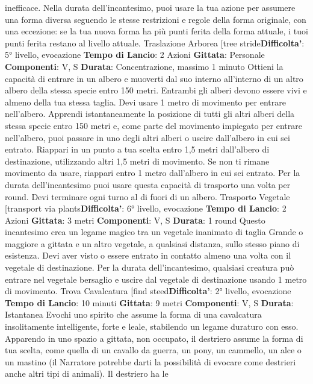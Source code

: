 \begin{multicols}{2}
inefficace.
Nella durata dell’incantesimo, puoi usare la tua azione
per assumere una forma diversa seguendo le stesse
restrizioni e regole della forma originale, con una
eccezione: se la tua nuova forma ha più punti ferita
della forma attuale, i tuoi punti ferita restano al livello
attuale.
Traslazione Arborea
[tree stride\textbf{Difficolta'}:
5° livello, evocazione
\textbf{Tempo di Lancio}: 2 Azioni
\textbf{Gittata}: Personale
\textbf{Componenti}: V, S
\textbf{Durata}: Concentrazione, massimo 1 minuto
Ottieni la capacità di entrare in un albero e muoverti dal
suo interno all’interno di un altro albero della stessa
specie entro 150 metri. Entrambi gli alberi devono
essere vivi e almeno della tua stessa taglia. Devi usare
1 metro di movimento per entrare nell’albero. Apprendi
istantaneamente la posizione di tutti gli altri alberi della
stessa specie entro 150 metri e, come parte del
movimento impiegato per entrare nell’albero, puoi
passare in uno degli altri alberi o uscire dall’albero in cui
sei entrato. Riappari in un punto a tua scelta entro 1,5
metri dall’albero di destinazione, utilizzando altri 1,5
metri di movimento. Se non ti rimane movimento da
usare, riappari entro 1 metro dall’albero in cui sei
entrato.
Per la durata dell’incantesimo puoi usare questa
capacità di trasporto una volta per round. Devi
terminare ogni turno al di fuori di un albero.
Trasporto Vegetale
[transport via plants\textbf{Difficolta'}:
6° livello, evocazione
\textbf{Tempo di Lancio}: 2 Azioni
\textbf{Gittata}: 3 metri
\textbf{Componenti}: V, S
\textbf{Durata}: 1 round
Questo incantesimo crea un legame magico tra un
vegetale inanimato di taglia Grande o maggiore a
gittata e un altro vegetale, a qualsiasi distanza, sullo
stesso piano di esistenza. Devi aver visto o essere
entrato in contatto almeno una volta con il vegetale di
destinazione. Per la durata dell’incantesimo, qualsiasi
creatura può entrare nel vegetale bersaglio e uscire dal
vegetale di destinazione usando 1 metro di
movimento.
Trova Cavalcatura
[find steed\textbf{Difficolta'}:
2° livello, evocazione
\textbf{Tempo di Lancio}: 10 minuti
\textbf{Gittata}: 9 metri
\textbf{Componenti}: V, S
\textbf{Durata}: Istantanea
Evochi uno spirito che assume la forma di una
cavalcatura insolitamente intelligente, forte e leale,
stabilendo un legame duraturo con esso. Apparendo in
uno spazio a gittata, non occupato, il destriero assume
la forma di tua scelta, come quella di un cavallo da
guerra, un pony, un cammello, un alce o un mastino (il
Narratore potrebbe darti la possibilità di evocare come
destrieri anche altri tipi di animali). Il destriero ha le

\end{multicols}
